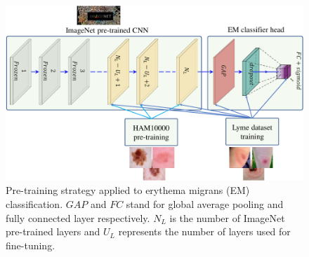 \begin{figure}[htb!]
	\centering
	\includegraphics[width=\textwidth,keepaspectratio]{images/pretraining/pretraining-cropped.pdf}
	\caption[Pre-training strategy applied to erythema migrans  classification]{Pre-training strategy applied to erythema migrans (EM) classification. $GAP$ and $FC$ stand for global average pooling and fully connected layer respectively. $N_{L}$ is the number of ImageNet pre-trained layers and $U_{L}$ represents the number of layers used for fine-tuning. }
	\label{fig:pre-training}
\end{figure}

